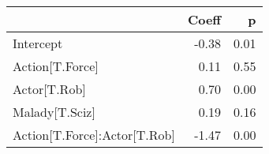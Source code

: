 \begin{tabular}{lrr}
\toprule
{} &  Coeff &    p \\
\midrule
Intercept                    &  -0.38 & 0.01 \\
Action[T.Force]              &   0.11 & 0.55 \\
Actor[T.Rob]                 &   0.70 & 0.00 \\
Malady[T.Sciz]               &   0.19 & 0.16 \\
Action[T.Force]:Actor[T.Rob] &  -1.47 & 0.00 \\
\bottomrule
\end{tabular}
